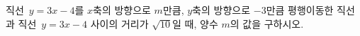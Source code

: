 직선~$y=3x-4$를 $x$축의 방향으로 $m$만큼, $y$축의 방향으로 $-3$만큼 평행이동한 직선과 직선~$y=3x-4$ 사이의 거리가 $\sqrt{10}$일 때, 양수 $m$의 값을 구하시오.
